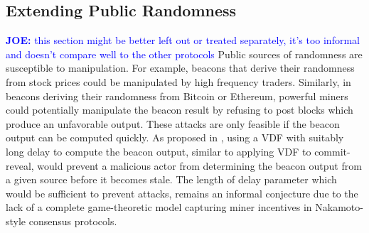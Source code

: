 \documentclass[letterpaper,twocolumn,10pt]{article}
\theoremstyle{definition}
\theoremstyle{remark}
\newcommand{\joenote}[1]{\textcolor{blue}{\textbf{JOE:} #1}}
\begin{document}
\subsection{Extending Public Randomness}
\joenote{this section might be better left out or treated separately, it's too informal and doesn't compare well to the other protocols}
Public sources of randomness are susceptible to manipulation. For example, beacons that derive their randomness from stock prices could be manipulated by high frequency traders. Similarly, in beacons deriving their randomness from Bitcoin or Ethereum, powerful miners could potentially manipulate the beacon result by refusing to post blocks which produce an unfavorable output. These attacks are only feasible if the beacon output can be computed quickly. As proposed in \cite{bunz2017proofs}, using a VDF with suitably long delay to compute the beacon output, similar to applying VDF to commit-reveal, would prevent a malicious actor from determining the beacon output from a given source before it becomes stale. The length of delay parameter which would be sufficient to prevent attacks, remains an informal conjecture due to the lack of a complete game-theoretic model capturing miner incentives in Nakamoto-style consensus protocols.
\end{document}
